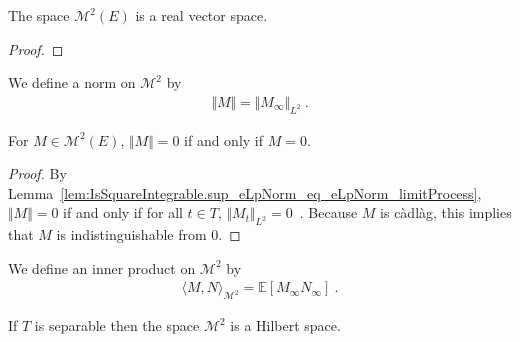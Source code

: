 \begin{lemma}\label{lem:L2Martingales.module}
  \leanok
The space $\mathcal{M}^2(E)$ is a real vector space.
\end{lemma}

\begin{proof}
\end{proof}


\begin{definition}\label{def:L2Martingales.norm}
  \leanok
We define a norm on $\mathcal{M}^2$ by
\begin{align*}
  \Vert M \Vert = \Vert M_\infty \Vert_{L^2}
  \: .
\end{align*}
\end{definition}


\begin{lemma}\label{lem:L2Martingales.norm_eq_zero}
  \leanok
For $M \in \mathcal{M}^2(E)$, $\Vert M \Vert = 0$ if and only if $M = 0$.
\end{lemma}

\begin{proof}
By Lemma~\ref{lem:IsSquareIntegrable.sup_eLpNorm_eq_eLpNorm_limitProcess}, $\Vert M \Vert = 0$ if and only if for all $t \in T$, $\Vert M_t \Vert_{L^2} = 0$~. Because $M$ is càdlàg, this implies that $M$ is indistinguishable from $0$.
\end{proof}


\begin{definition}\label{def:L2Martingales.inner}
  \leanok
We define an inner product on $\mathcal{M}^2$ by
\begin{align*}
  \langle M, N \rangle_{\mathcal{M}^2} = \mathbb{E}[M_\infty N_\infty]
  \: .
\end{align*}
\end{definition}


\begin{theorem}\label{thm:hilbertSpace_L2Martingales}
  \leanok
If $T$ is separable then the space $\mathcal{M}^2$ is a Hilbert space.
\end{theorem}

